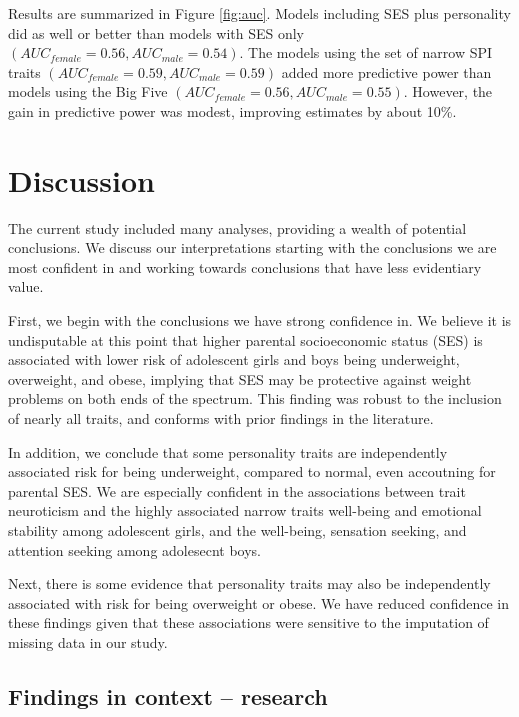 \documentclass[man]{apa6}
\begin{document}
Results are summarized in Figure \ref{fig:auc}. Models including SES plus personality did as well or better than models with SES only \((AUC_{female} = 0.56, AUC_{male} = 0.54)\). The models using the set of narrow SPI traits \((AUC_{female} = 0.59, AUC_{male} = 0.59)\) added more predictive power than models using the Big Five \((AUC_{female} = 0.56, AUC_{male} = 0.55)\). However, the gain in predictive power was modest, improving estimates by about 10\%.

\hypertarget{discussion}{%
\section{Discussion}\label{discussion}}

The current study included many analyses, providing a wealth of potential conclusions. We discuss our interpretations starting with the conclusions we are most confident in and working towards conclusions that have less evidentiary value.

First, we begin with the conclusions we have strong confidence in. We believe it is undisputable at this point that higher parental socioeconomic status (SES) is associated with lower risk of adolescent girls and boys being underweight, overweight, and obese, implying that SES may be protective against weight problems on both ends of the spectrum. This finding was robust to the inclusion of nearly all traits, and conforms with prior findings in the literature.

In addition, we conclude that some personality traits are independently associated risk for being underweight, compared to normal, even accoutning for parental SES. We are especially confident in the associations between trait neuroticism and the highly associated narrow traits well-being and emotional stability among adolescent girls, and the well-being, sensation seeking, and attention seeking among adolesecnt boys.

Next, there is some evidence that personality traits may also be independently associated with risk for being overweight or obese. We have reduced confidence in these findings given that these associations were sensitive to the imputation of missing data in our study.

\hypertarget{findings-in-context-research}{%
\subsection{Findings in context -- research}\label{findings-in-context-research}}
\end{document}

